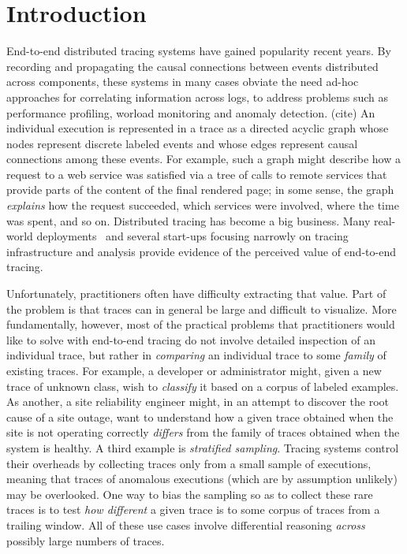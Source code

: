 \section{Introduction}


End-to-end distributed tracing systems have gained popularity recent years.
By recording and propagating the causal connections between events distributed across components,
these systems in many cases obviate the need ad-hoc approaches for correlating information across logs, to address
problems such as performance profiling, worload monitoring and anomaly detection. (cite)
An individual execution is represented in a trace as a directed acyclic graph
whose nodes represent discrete labeled events and whose edges represent causal connections among these events.  For example, such a graph
might describe how a request to a web service was satisfied via a tree of calls to remote services that provide parts of the content of the final
rendered page; in some sense, the graph \emph{explains} how the request succeeded, which services were involved, where the time was spent, and so on.
Distributed tracing has become a big business.  Many real-world deployments~\cite{} and several start-ups
focusing narrowly on tracing infrastructure and analysis provide evidence of the perceived value of 
end-to-end tracing.  

Unfortunately, practitioners often have difficulty extracting that value.  Part of the problem is that traces can in general be large and difficult
to visualize.  More fundamentally, however, most of the practical problems that practitioners would like to solve with end-to-end tracing
do not involve detailed inspection of an individual trace, but rather in \emph{comparing} an individual trace to some \emph{family} of existing traces.
For example, a developer or administrator might, given a new trace of unknown class, wish to \emph{classify} it based on a corpus of labeled examples.
As another, a site reliability engineer might, in an attempt to discover the root cause of a site outage, want to understand how a given trace obtained
when the site is not operating correctly \emph{differs} from the family of traces obtained when the system is healthy.  
A third example is \emph{stratified sampling}.  Tracing systems control their overheads by collecting traces only from a small sample of executions, meaning
that traces of anomalous executions (which are by assumption unlikely) may be overlooked.  One way to bias the sampling so as to collect these rare traces
is to test \emph{how different} a given trace is to some corpus of traces from a trailing window.
All of these use cases involve
differential reasoning \emph{across} possibly large numbers of traces.

